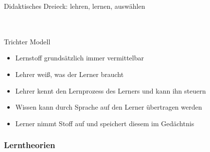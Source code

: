 \documentclass[a4paper]{article}
\begin{document}
Didaktisches Dreieck: lehren, lernen, auswählen\\

~\\~\\
Trichter Modell
\begin{itemize}
	\item Lernstoff grundsätzlich immer vermittelbar
	\item Lehrer weiß, was der Lerner braucht
	\item Lehrer kennt den Lernprozess des Lerners und kann ihn steuern
	\item Wissen kann durch Sprache auf den Lerner übertragen werden
	\item Lerner nimmt Stoff auf und speichert diesem im Gedächtnis
\end{itemize}

\subsubsection{Lerntheorien}
\end{document}
